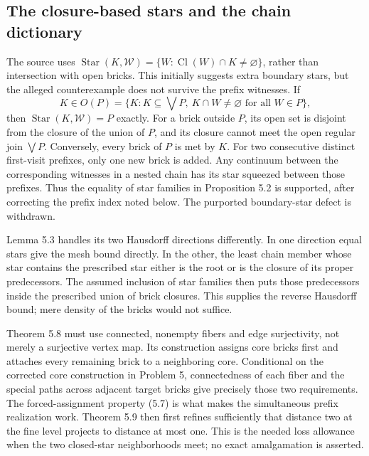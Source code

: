 \documentclass[10pt]{article}
\begin{document}
\subsection*{The closure-based stars and the chain dictionary}
The source uses \(\operatorname{Star}(K,\mathcal W)=\{W:\operatorname{Cl}(W)\cap K\ne\varnothing\}\), rather than intersection with open bricks. This initially suggests extra boundary stars, but the alleged counterexample does not survive the prefix witnesses. If \[K\in O(P)=\{K:K\subseteq\bigvee P,\ K\cap W\ne\varnothing
                       \text{ for all }W\in P\},\] then \(\operatorname{Star}(K,\mathcal W)=P\) exactly. For a brick outside \(P\), its open set is disjoint from the closure of the union of \(P\), and its closure cannot meet the open regular join \(\bigvee P\). Conversely, every brick of \(P\) is met by \(K\). For two consecutive distinct first-visit prefixes, only one new brick is added. Any continuum between the corresponding witnesses in a nested chain has its star squeezed between those prefixes. Thus the equality of star families in Proposition 5.2 is supported, after correcting the prefix index noted below. The purported boundary-star defect is withdrawn.\par
Lemma 5.3 handles its two Hausdorff directions differently. In one direction equal stars give the mesh bound directly. In the other, the least chain member whose star contains the prescribed star either is the root or is the closure of its proper predecessors. The assumed inclusion of star families then puts those predecessors inside the prescribed union of brick closures. This supplies the reverse Hausdorff bound; mere density of the bricks would not suffice.\par
Theorem 5.8 must use connected, nonempty fibers and edge surjectivity, not merely a surjective vertex map. Its construction assigns core bricks first and attaches every remaining brick to a neighboring core. Conditional on the corrected core construction in Problem 5, connectedness of each fiber and the special paths across adjacent target bricks give precisely those two requirements. The forced-assignment property (5.7) is what makes the simultaneous prefix realization work. Theorem 5.9 then first refines sufficiently that distance two at the fine level projects to distance at most one. This is the needed loss allowance when the two closed-star neighborhoods meet; no exact amalgamation is asserted.\par
\end{document}
